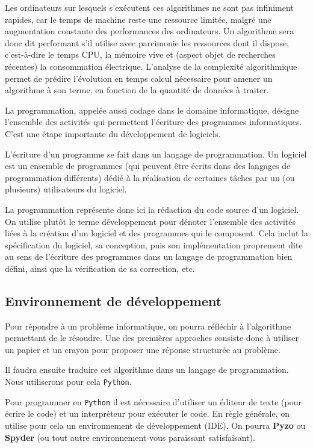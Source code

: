 Les ordinateurs sur lesquels s'exécutent ces algorithmes ne sont pas infiniment rapides, car le temps de machine reste une ressource limitée, malgré une augmentation constante des performances des ordinateurs. Un algorithme sera donc dit performant s'il utilise avec parcimonie les ressources dont il dispose, c'est-à-dire le temps CPU, la mémoire vive et (aspect objet de recherches récentes) la consommation électrique. L’analyse de la complexité algorithmique permet de prédire l'évolution en temps calcul nécessaire pour amener un algorithme à son terme, en fonction de la quantité de données à traiter.

\begin{defi}
La programmation, appelée aussi codage dans le domaine informatique, désigne l'ensemble des activités qui permettent l'écriture des programmes informatiques. C'est une étape importante du développement de logiciels.

L'écriture d'un programme se fait dans un langage de programmation. Un logiciel est un ensemble de programmes (qui peuvent être écrits dans des langages de programmation différents) dédié à la réalisation de certaines tâches par un (ou plusieurs) utilisateurs du logiciel.

\end{defi}

La programmation représente donc ici la rédaction du code source d'un logiciel. On utilise plutôt le terme développement pour dénoter l'ensemble des activités liées à la création d'un logiciel et des programmes qui le composent. Cela inclut la spécification du logiciel, sa conception, puis son implémentation proprement dite au sens de l'écriture des programmes dans un langage de programmation bien défini, ainsi que la vérification de sa correction, etc.

\subsection{Environnement de développement}
Pour répondre à un problème informatique, on pourra réfléchir à l'algorithme permettant de le résoudre. Une des premières approches consiste donc à utiliser un papier et un crayon pour proposer une réponse structurée au problème.

Il faudra ensuite traduire cet algorithme dans un langage de programmation. Nous utiliserons pour cela \texttt{Python}.

Pour programmer en \texttt{Python} il est nécessaire d'utiliser un éditeur de texte (pour écrire le code) et un interpréteur pour exécuter le code. 
En règle générale, on utilise pour cela un environnement de développement (IDE). On pourra \textbf{Pyzo} ou \textbf{Spyder} (ou tout autre environnement vous paraissant satisfaisant). 

